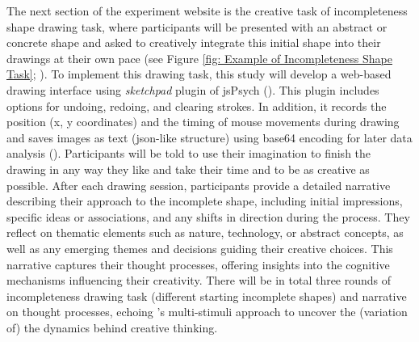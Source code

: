 \documentclass[../Proposal.tex]{subfiles}
\begin{document}
The next section of the experiment website is the creative task of incompleteness shape drawing task, where participants will be presented with an abstract or concrete shape and asked to creatively integrate this initial shape into their drawings at their own pace (see Figure \ref{fig: Example of Incompleteness Shape Task}; \cite{patterson_audra_2023}). To implement this drawing task, this study will develop a web-based drawing interface using \textit{sketchpad} plugin of jsPsych (\cite{leeuw_jspsych_2023}). This plugin includes options for undoing, redoing, and clearing strokes. In addition, it records the position (x, y coordinates) and the timing of mouse movements during drawing and saves images as text (json-like structure) using base64 encoding for later data analysis (\cite{bainbridge_tutorial_2022}). Participants will be told to use their imagination to finish the drawing in any way they like and take their time and to be as creative as possible. After each drawing session, participants provide a detailed narrative describing their approach to the incomplete shape, including initial impressions, specific ideas or associations, and any shifts in direction during the process. They reflect on thematic elements such as nature, technology, or abstract concepts, as well as any emerging themes and decisions guiding their creative choices. This narrative captures their thought processes, offering insights into the cognitive mechanisms influencing their creativity. There will be in total three rounds of incompleteness drawing task (different starting incomplete shapes) and narrative on thought processes, echoing \textcite{barbot_dynamics_2018}'s multi-stimuli approach to uncover the (variation of) the dynamics behind creative thinking.
\end{document}
